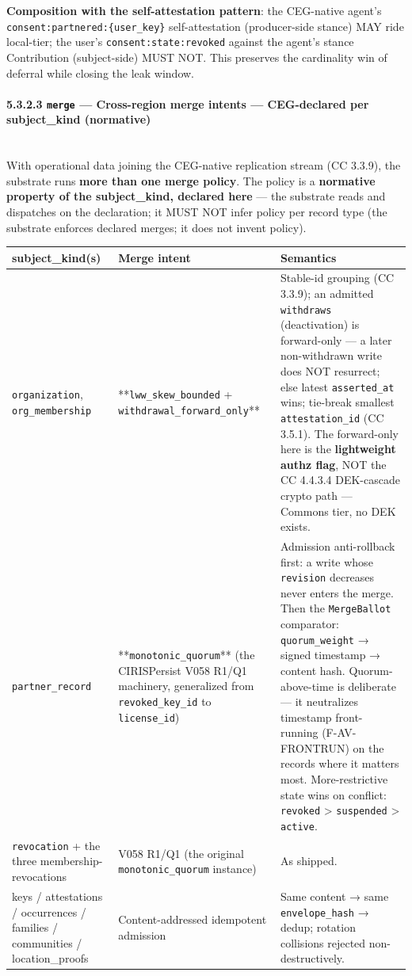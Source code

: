 \documentclass[11pt]{article}
\begin{document}
\textbf{Composition with the self-attestation pattern}: the CEG-native agent's \texttt{consent:partnered:\{user\_key\}} self-attestation (producer-side stance) MAY ride local-tier; the user's \texttt{consent:state:revoked} against the agent's stance Contribution (subject-side) MUST NOT. This preserves the cardinality win of deferral while closing the leak window.


\paragraph{5.3.2.3 \texttt{merge} — Cross-region merge intents — CEG-declared per subject\_kind (normative)}\mbox{}\\


With operational data joining the CEG-native replication stream (CC 3.3.9), the substrate runs \textbf{more than one merge policy}. The policy is a \textbf{normative property of the subject\_kind, declared here} — the substrate reads and dispatches on the declaration; it MUST NOT infer policy per record type (the substrate enforces declared merges; it does not invent policy).


{\footnotesize
\begin{longtable}{|p{5.33cm}|p{5.33cm}|p{5.33cm}|}\hline
\textbf{subject\_kind(s)} & \textbf{Merge intent} & \textbf{Semantics} \\ \hline\endhead
\texttt{organization}, \texttt{org\_membership} & **\texttt{lww\_skew\_bounded} + \texttt{withdrawal\_forward\_only}** & Stable-id grouping (CC 3.3.9); an admitted \texttt{withdraws} (deactivation) is forward-only — a later non-withdrawn write does NOT resurrect; else latest \texttt{asserted\_at} wins; tie-break smallest \texttt{attestation\_id} (CC 3.5.1). The forward-only here is the \textbf{lightweight authz flag}, NOT the CC 4.4.3.4 DEK-cascade crypto path — Commons tier, no DEK exists. \\ \hline
\texttt{partner\_record} & **\texttt{monotonic\_quorum}** (the CIRISPersist V058 R1/Q1 machinery, generalized from \texttt{revoked\_key\_id} to \texttt{license\_id}) & Admission anti-rollback first: a write whose \texttt{revision} decreases never enters the merge. Then the \texttt{MergeBallot} comparator: \texttt{quorum\_weight} → signed timestamp → content hash. Quorum-above-time is deliberate — it neutralizes timestamp front-running (F-AV-FRONTRUN) on the records where it matters most. More-restrictive state wins on conflict: \texttt{revoked} > \texttt{suspended} > \texttt{active}. \\ \hline
\texttt{revocation} + the three membership-revocations & V058 R1/Q1 (the original \texttt{monotonic\_quorum} instance) & As shipped. \\ \hline
keys / attestations / occurrences / families / communities / location\_proofs & Content-addressed idempotent admission & Same content → same \texttt{envelope\_hash} → dedup; rotation collisions rejected non-destructively. \\ \hline
\end{longtable}}
\end{document}
